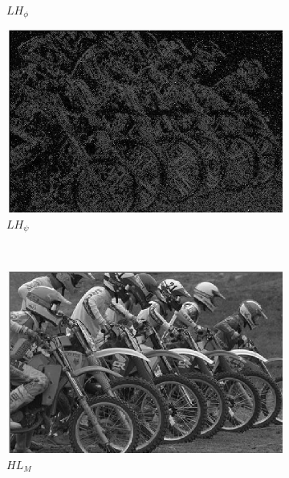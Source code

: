 \begin{figure}
\begin{subfigure}[b]{0.23\textwidth}
         \caption{$LH_{\phi}$}
         \label{fig:qwt7}
     \end{subfigure}
     \begin{subfigure}[b]{0.23\textwidth}
         \centering
         \includegraphics[width=\textwidth]{./figs/o_1_2_3_q}
         \caption{$LH_{\psi}$}
         \label{fig:qwt8}
     \end{subfigure}
     \\
     \begin{subfigure}[b]{0.23\textwidth}
         \centering
         \includegraphics[width=\textwidth]{./figs/m_2_1_q}
         \caption{$HL_M$}
         \label{fig:qwt9}
     \end{subfigure}
     \begin{subfigure}[b]{0.23\textwidth}
         \centering

\end{subfigure}
\end{figure}
